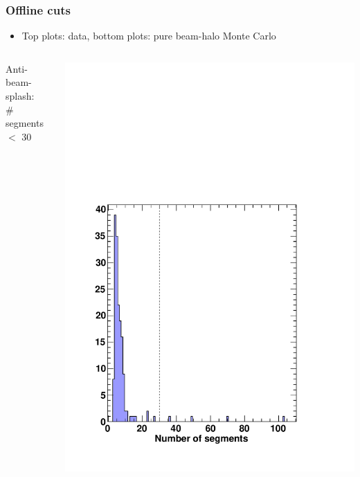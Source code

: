 \documentclass[compress]{beamer}
\begin{document}
\begin{frame}
\frametitle{Offline cuts}
\label{thispage}

\begin{itemize}
\item Top plots: data, bottom plots: pure beam-halo Monte Carlo
\end{itemize}

\begin{columns}
Anti-beam-splash: \\ \# segments $<$ 30 \\ \mbox{ }

\includegraphics[width=\linewidth]{REAL_num_segments.pdf}


\end{columns}
\end{frame}
\end{document}
